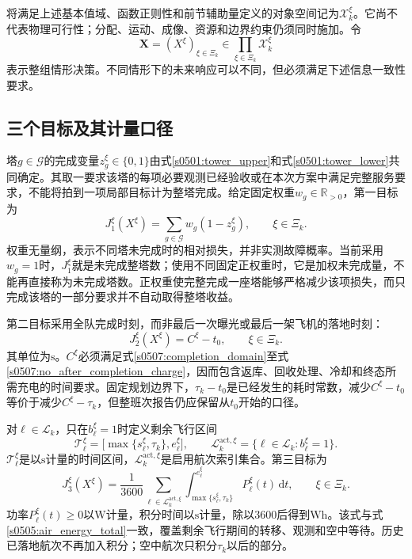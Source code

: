 将满足上述基本值域、函数正则性和前节辅助量定义的对象空间记为$\mathscr X_k^\xi$。它尚不代表物理可行性；分配、运动、成像、资源和边界约束仍须同时施加。令
\begin{equation}
 \mathbf X=(X^\xi)_{\xi\in\Xi_k}
 \in\prod_{\xi\in\Xi_k}\mathscr X_k^\xi
 \label{s0508:scenario_decisions}
\end{equation}
表示整组情形决策。不同情形下的未来响应可以不同，但必须满足下述信息一致性要求。

\subsection{三个目标及其计量口径}

塔$g\in\mathcal G$的完成变量$z_g^\xi\in\{0,1\}$由式\eqref{s0501:tower_upper}和式\eqref{s0501:tower_lower}共同确定。其取一要求该塔的每项必要观测已经验收或在本次方案中满足完整服务要求，不能将拍到一项局部目标计为整塔完成。给定固定权重$w_g\in\mathbb R_{>0}$，第一目标为
\begin{equation}
 J_1^\xi(X^\xi)
 =\sum_{g\in\mathcal G}w_g(1-z_g^\xi),
 \qquad \xi\in\Xi_k.
 \label{s0508:first_objective}
\end{equation}
权重无量纲，表示不同塔未完成时的相对损失，并非实测故障概率。当前采用$w_g=1$时，$J_1^\xi$就是未完成整塔数；使用不同固定正权重时，它是加权未完成量，不能再直接称为未完成塔数。正权重使完整完成一座塔能够严格减少该项损失，而只完成该塔的一部分要求并不自动取得整塔收益。

第二目标采用全队完成时刻，而非最后一次曝光或最后一架飞机的落地时刻：
\begin{equation}
 J_2^\xi(X^\xi)=C^\xi-t_0,
 \qquad \xi\in\Xi_k.
 \label{s0508:second_objective}
\end{equation}
其单位为$\mathrm s$。$C^\xi$必须满足式\eqref{s0507:completion_domain}至式\eqref{s0507:no_after_completion_charge}，因而包含返库、回收处理、冷却和终态所需充电的时间要求。固定规划边界下，$\tau_k-t_0$是已经发生的耗时常数，减少$C^\xi-t_0$等价于减少$C^\xi-\tau_k$，但整班次报告仍应保留从$t_0$开始的口径。

对$\ell\in\mathcal L_k$，只在$b_\ell^\xi=1$时定义剩余飞行区间
\begin{equation}
 \mathcal T_\ell^\xi
 =\bigl[\max\{s_\ell^\xi,\tau_k\},e_\ell^\xi\bigr],
 \qquad
 \mathcal L_k^{\mathrm{act},\xi}
 =\{\ell\in\mathcal L_k:b_\ell^\xi=1\}.
 \label{s0508:remaining_flight_domain}
\end{equation}
$\mathcal T_\ell^\xi$是以$\mathrm s$计量的时间区间，$\mathcal L_k^{\mathrm{act},\xi}$是启用航次索引集合。第三目标为
\begin{equation}
 J_3^\xi(X^\xi)
 =\frac{1}{3600}
  \sum_{\ell\in\mathcal L_k^{\mathrm{act},\xi}}
  \int_{\max\{s_\ell^\xi,\tau_k\}}^{e_\ell^\xi}
       P_\ell^\xi(t)\,\mathrm dt,
 \qquad \xi\in\Xi_k.
 \label{s0508:third_objective}
\end{equation}
功率$P_\ell^\xi(t)\ge0$以$\mathrm W$计量，积分时间以$\mathrm s$计量，除以$3600$后得到$\mathrm{Wh}$。该式与式\eqref{s0505:air_energy_total}一致，覆盖剩余飞行期间的转移、观测和空中等待。历史已落地航次不再加入积分；空中航次只积分$\tau_k$以后的部分。

